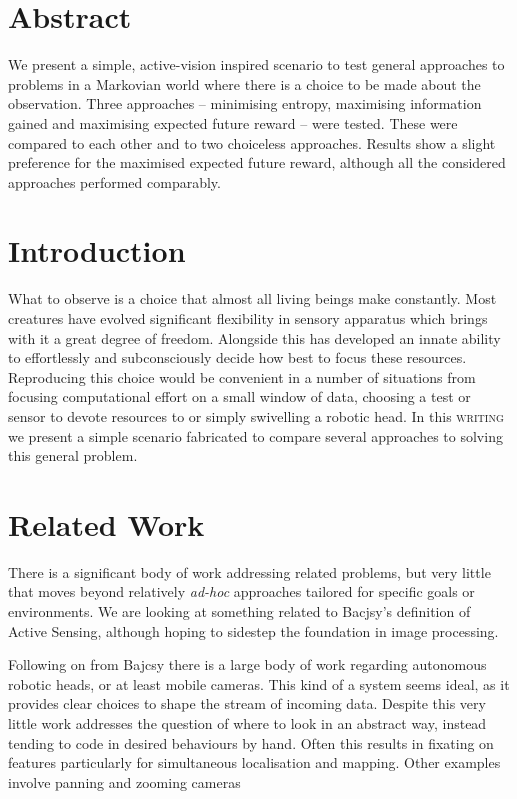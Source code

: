 \documentclass{article}
\begin{document}
\section{Abstract}
We present a simple, active-vision inspired scenario to test general approaches to 
problems in a Markovian world where there is a choice to be made about the observation.
Three approaches -- minimising entropy, maximising information gained and maximising
expected future reward -- were tested. These were compared to each other and to two
choiceless approaches. Results show a slight preference for the maximised expected future
reward, although all the considered approaches performed comparably.

\section{Introduction}
What to observe is a choice that almost all living beings make constantly. Most creatures
have evolved significant flexibility in sensory apparatus which brings with it a great 
degree of freedom. Alongside this has developed an innate ability to effortlessly and
subconsciously decide how best to focus these resources. Reproducing this choice would 
be convenient in a number of situations from focusing computational effort on a small 
window of data, choosing a test or sensor to devote resources to or simply swivelling
a robotic head. In this {\textsc{writing}} we present a simple scenario fabricated
to compare several approaches to solving this general problem. 

\section{Related Work}
There is a significant body of work addressing related problems, but very little that 
moves beyond relatively \textit{ad-hoc} approaches tailored for specific goals or 
environments. We are looking at something related to Bacjsy's definition of Active 
Sensing, although hoping to sidestep the foundation in image processing.
\autocite{bajcsy1988active}

Following on from Bajcsy there is a large body of work regarding autonomous robotic 
heads, or at least mobile cameras. This kind of a system seems ideal, as it provides 
clear choices to shape the stream of incoming data. Despite this very little work
addresses the question of where to look in an abstract way, instead tending to code in 
desired behaviours by hand. Often this results in fixating on features particularly for 
simultaneous localisation and mapping. \autocite{davison2002simultaneous, davison20013d}
Other examples involve panning and zooming cameras \autocite{minut2001reinforcement}
\end{document}
